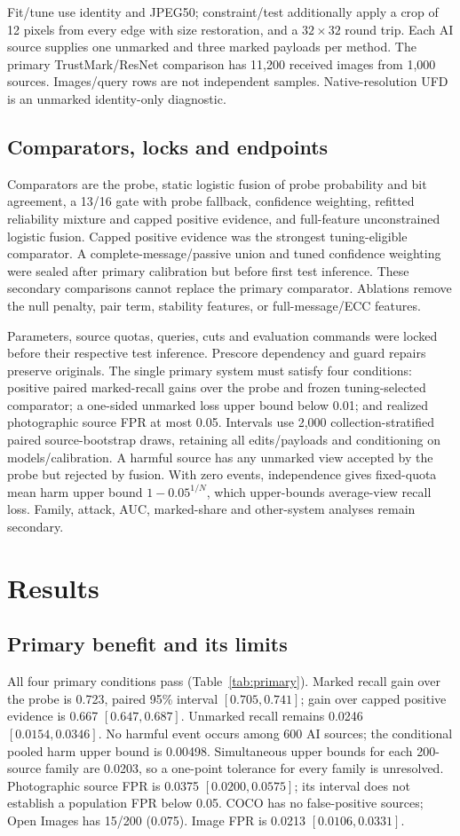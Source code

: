 \documentclass[conference]{IEEEtran}
\begin{document}
Fit/tune use identity and JPEG50; constraint/test additionally apply a crop
of 12 pixels from every edge with size restoration, and a $32\times32$ round trip.
Each AI source supplies one unmarked and three
marked payloads per method. The primary TrustMark/ResNet comparison has 11,200
received images from 1,000 sources. Images/query rows are not independent
samples. Native-resolution UFD is an unmarked identity-only diagnostic.

\subsection{Comparators, locks and endpoints}
Comparators are the probe, static logistic fusion of probe probability and bit
agreement, a 13/16 gate with probe fallback, confidence weighting, refitted
reliability mixture and capped positive evidence, and full-feature unconstrained
logistic fusion. Capped positive evidence was the strongest tuning-eligible
comparator. A complete-message/passive union and tuned confidence weighting
were sealed after primary calibration but before first test inference.
These secondary comparisons cannot replace the primary comparator.
Ablations remove the null penalty, pair term, stability features,
or full-message/ECC features.

Parameters, source quotas, queries, cuts and evaluation commands were locked
before their respective test inference. Prescore dependency and guard repairs
preserve originals. The single primary system must satisfy four conditions:
positive paired marked-recall gains over the probe and frozen tuning-selected
comparator; a one-sided unmarked loss upper bound below 0.01; and realized
photographic source FPR at most 0.05.
Intervals use 2,000 collection-stratified paired source-bootstrap draws,
retaining all edits/payloads and conditioning on models/calibration.
A harmful source has any unmarked view accepted by the probe but rejected by
fusion. With zero events, independence gives fixed-quota mean harm upper bound
$1-0.05^{1/N}$, which upper-bounds average-view recall loss.
Family, attack, AUC, marked-share and other-system analyses remain secondary.

\section{Results}
\subsection{Primary benefit and its limits}
All four primary conditions pass (Table~\ref{tab:primary}). Marked recall gain
over the probe is 0.723, paired 95\% interval $[0.705,0.741]$; gain over capped
positive evidence is 0.667 $[0.647,0.687]$.
Unmarked recall remains 0.0246 $[0.0154,0.0346]$.
No harmful event occurs among 600 AI sources; the conditional pooled harm upper
bound is 0.00498. Simultaneous upper bounds for each 200-source family are
0.0203, so a one-point tolerance for every family is unresolved.
Photographic source FPR is 0.0375 $[0.0200,0.0575]$; its interval does not
establish a population FPR below 0.05. COCO has no false-positive sources;
Open Images has 15/200 (0.075). Image FPR is 0.0213 $[0.0106,0.0331]$.
\end{document}

